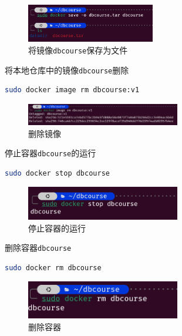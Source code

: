 \documentclass{article}
\begin{document}
\begin{figure}[H]
\centering
\includegraphics[width=0.5\textwidth]{img/29.png}
\caption{将镜像\texttt{dbcourse}保存为文件}
\end{figure}

将本地仓库中的镜像\texttt{dbcourse}删除

\begin{lstlisting}[language=bash]
sudo docker image rm dbcourse:v1
\end{lstlisting}

\begin{figure}[H]
\centering
\includegraphics[width=0.6\textwidth]{img/30.png}
\caption{删除镜像}
\end{figure}

停止容器\texttt{dbcourse}的运行

\begin{lstlisting}[language=bash]
sudo docker stop dbcourse
\end{lstlisting}

\begin{figure}[H]
\centering
\includegraphics[width=0.6\textwidth]{img/31.png}
\caption{停止容器的运行}
\end{figure}

删除容器\texttt{dbcourse}

\begin{lstlisting}[language=bash]
sudo docker rm dbcourse
\end{lstlisting}

\begin{figure}[H]
\centering
\includegraphics[width=0.6\textwidth]{img/32.png}
\caption{删除容器}
\end{figure}
\end{document}
